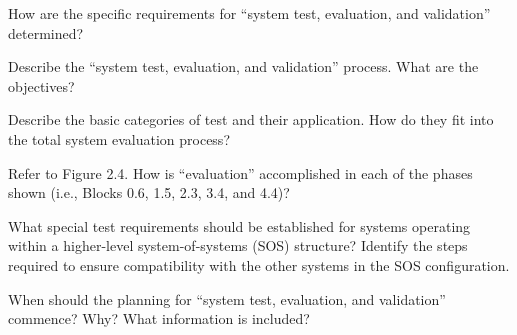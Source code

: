 \begin{exercises}
    \begin{exercise}
    \label{sea-06-01}
        How are the specific requirements for “system test, evaluation, and validation” determined?
    \end{exercise}
    \begin{solution}
    \end{solution}
    
    \begin{exercise}
    \label{sea-06-02}
        Describe the “system test, evaluation, and validation” process. What are the objectives?
    \end{exercise}
    \begin{solution}
    \end{solution}
    
    \begin{exercise}
    \label{sea-06-03}
        Describe the basic categories of test and their application. How do they fit into the total system evaluation process?
    \end{exercise}
    \begin{solution}
    \end{solution}
    
    \begin{exercise}
    \label{sea-06-04}
        Refer to Figure 2.4. How is “evaluation” accomplished in each of the phases shown (i.e., Blocks 0.6, 1.5, 2.3, 3.4, and 4.4)?
    \end{exercise}
    \begin{solution}
    \end{solution}
    
    \begin{exercise}
    \label{sea-06-05}
        What special test requirements should be established for systems operating within a higher-level system-of-systems (SOS) structure? Identify the steps required to ensure compatibility with the other systems in the SOS configuration. 
    \end{exercise}
    \begin{solution}
    \end{solution}
    
    \begin{exercise}
    \label{sea-06-06}
        When should the planning for “system test, evaluation, and validation” commence? Why? What information is included?
    \end{exercise}
    \begin{solution}
    \end{solution}
    

\end{exercises}

